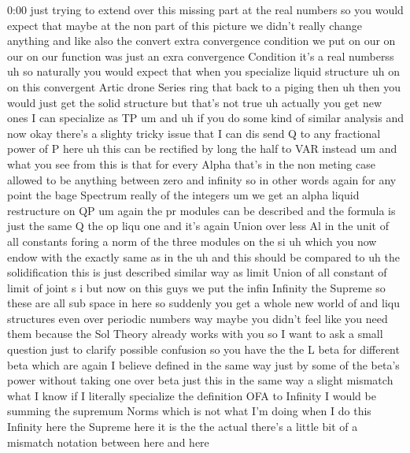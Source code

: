 \begin{unfinished}{0:00}
just  trying  to  extend  over  this  missing
part  at  the  real  numbers  so  you  would
expect  that  maybe  at  the  non  part  of
this  picture  we  didn't  really  change
anything  and  like  also  the  convert  extra
convergence  condition  we  put  on  our  on
our  on  our  function  was  just  an  exra
convergence  Condition  it's  a  real
numberss  uh  so  naturally  you  would
expect  that  when  you  specialize  liquid
structure
uh  on  on  this  convergent  Artic  drone
Series  ring  that  back  to  a  piging
then  uh  then  you  would  just  get  the
solid  structure  but  that's  not  true  uh
actually  you  get  new
ones  I  can  specialize  as
TP
um
and
uh  if  you  do  some  kind  of  similar
analysis  and  now  okay  there's  a  slighty
tricky  issue  that  I  can  dis  send  Q  to
any  fractional  power  of  P  here  uh  this
can  be  rectified  by  long  the  half  to  VAR
instead
um  and  what  you  see  from  this  is  that
for  every  Alpha  that's  in  the  non  meting
case  allowed  to  be  anything  between  zero
and
infinity  so  in  other  words  again  for  any
point  the  bage  Spectrum  really  of  the
integers
um  we  get  an  alpha  liquid
restructure  on  QP
um  again  the  pr  modules  can  be  described
and  the  formula  is  just  the
same
Q  the  op  liqu  one  and  it's  again  Union
over  less  Al  in  the  unit  of  all
constants  foring  a
norm  of  the  three  modules  on  the
si  uh  which  you  now  endow  with  the
exactly
same  as  in
the  uh  and  this  should  be  compared  to
uh  the
solidification  this  is  just  described
similar  way  as  limit  Union  of  all
constant  of  limit  of  joint  s  i  but  now
on  this  guys  we  put  the  infin  Infinity
the
Supreme  so  these  are  all  sub  space  in
here
so  suddenly  you  get  a  whole  new  world  of
and  liqu  structures  even  over  periodic
numbers  way  maybe  you  didn't  feel  like
you  need  them  because  the  Sol  Theory
already  works  with
you
so  I  want  to  ask  a  small  question  just
to  clarify  possible  confusion  so  you
have  the  the  L  beta  for  different  beta
which  are  again  I  believe  defined  in  the
same  way  just  by  some  of  the  beta's
power  without  taking  one  over  beta  just
this  in  the  same  way  a  slight  mismatch
what  I  know  if  I  literally  specialize
the  definition  OFA  to  Infinity  I  would
be  summing  the  supremum  Norms  which  is
not  what  I'm  doing  when  I  do  this
Infinity  here  the
Supreme  here  it  is  the  the
actual  there's  a  little  bit  of  a
mismatch  notation  between  here  and  here

\end{unfinished}
